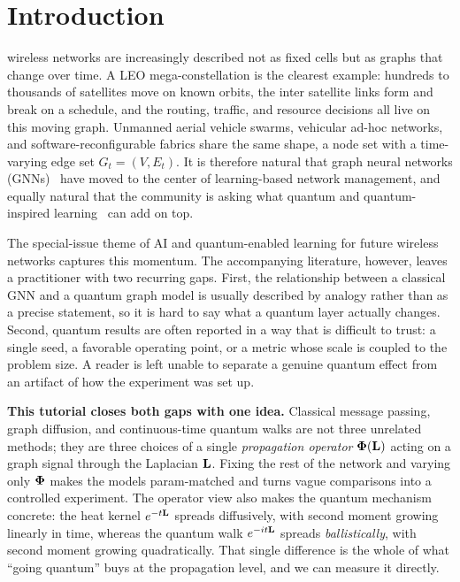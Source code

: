 \section{Introduction}
 wireless networks are increasingly described not as fixed
cells but as graphs that change over time. A LEO mega-constellation is the clearest
example: hundreds to thousands of satellites move on known orbits, the inter
satellite links form and break on a schedule, and the routing, traffic, and resource
decisions all live on this moving graph. Unmanned aerial vehicle swarms, vehicular
ad-hoc networks, and software-reconfigurable fabrics share the same shape, a node
set with a time-varying edge set $G_t=(V,E_t)$. It is therefore natural that graph
neural networks (GNNs)~\cite{kipf2017gcn,wu2021gnnsurvey} have moved to the center of
learning-based network management, and equally natural that the community is asking
what quantum and quantum-inspired learning~\cite{biamonte2017qml} can add on top.

The special-issue theme of AI and quantum-enabled learning for future wireless
networks captures this momentum. The accompanying literature, however, leaves a
practitioner with two recurring gaps. First, the relationship between a classical
GNN and a quantum graph model is usually described by analogy rather than as a
precise statement, so it is hard to say what a quantum layer actually changes.
Second, quantum results are often reported in a way that is difficult to trust:
a single seed, a favorable operating point, or a metric whose scale is coupled to
the problem size. A reader is left unable to separate a genuine quantum effect from
an artifact of how the experiment was set up.

\textbf{This tutorial closes both gaps with one idea.} Classical message passing,
graph diffusion, and continuous-time quantum walks are not three unrelated methods;
they are three choices of a single \emph{propagation operator} $\boldsymbol{\Phi}(\mathbf{L})$ acting
on a graph signal through the Laplacian $\mathbf{L}$. Fixing the rest of the network and
varying only $\boldsymbol{\Phi}$ makes the models param-matched and turns vague comparisons into
a controlled experiment. The operator view also makes the quantum mechanism concrete:
the heat kernel $e^{-t\mathbf{L}}$ spreads diffusively, with second moment growing linearly
in time, whereas the quantum walk $e^{-it\mathbf{L}}$ spreads \emph{ballistically}, with
second moment growing quadratically. That single difference is the whole of what
``going quantum'' buys at the propagation level, and we can measure it directly.


